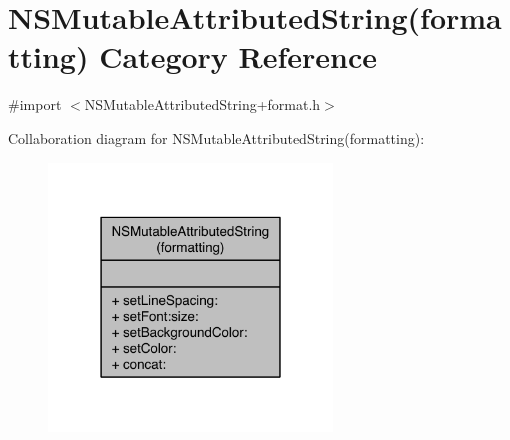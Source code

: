 \hypertarget{category_n_s_mutable_attributed_string_07formatting_08}{\section{N\-S\-Mutable\-Attributed\-String(formatting) Category Reference}
\label{category_n_s_mutable_attributed_string_07formatting_08}
}


{\ttfamily \#import $<$N\-S\-Mutable\-Attributed\-String+format.\-h$>$}



Collaboration diagram for N\-S\-Mutable\-Attributed\-String(formatting)\-:
\nopagebreak
\begin{figure}[H]
\begin{center}
\leavevmode
\includegraphics[width=214pt]{category_n_s_mutable_attributed_string_07formatting_08__coll__graph}
\end{center}
\end{figure}

